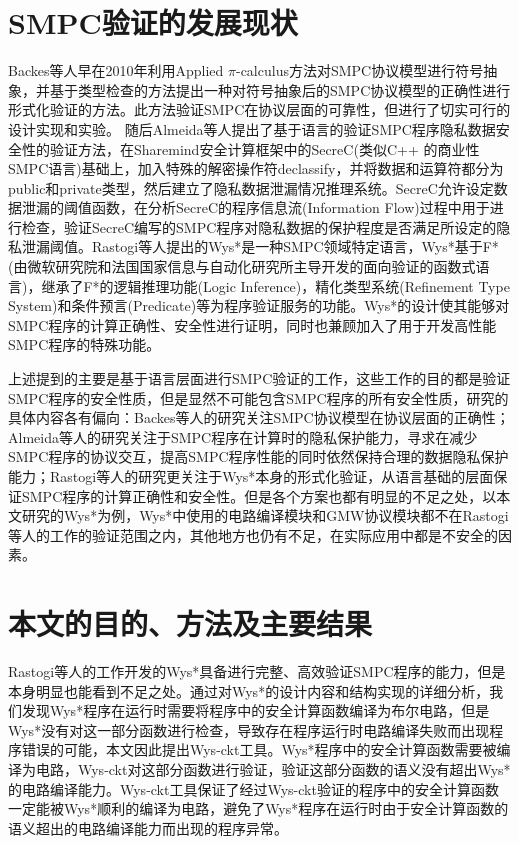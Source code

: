 \section{SMPC验证的发展现状}\label{sec:system}
Backes等人\citep{backes2010computationally}早在2010年利用Applied $\pi$-calculus方法对SMPC协议模型进行符号抽象，并基于类型检查的方法提出一种对符号抽象后的SMPC协议模型的正确性进行形式化验证的方法。此方法验证SMPC在协议层面的可靠性，但进行了切实可行的设计实现和实验。 随后Almeida等人\citep{almeida2018enforcing}提出了基于语言的验证SMPC程序隐私数据安全性的验证方法，在Sharemind\citep{bogdanov2008sharemind}安全计算框架中的SecreC(类似C++ 的商业性SMPC语言)基础上，加入特殊的解密操作符declassify，并将数据和运算符都分为public和private类型，然后建立了隐私数据泄漏情况推理系统。SecreC允许设定数据泄漏的阈值函数，在分析SecreC的程序信息流(Information Flow)过程中用于进行检查，验证SecreC编写的SMPC程序对隐私数据的保护程度是否满足所设定的隐私泄漏阈值。Rastogi等人\citep{rastogi2019textsc}提出的Wys*是一种SMPC领域特定语言，Wys*基于F*(由微软研究院和法国国家信息与自动化研究所主导开发的面向验证的函数式语言)，继承了F*的逻辑推理功能(Logic Inference)，精化类型系统(Refinement Type System)和条件预言(Predicate)等为程序验证服务的功能。Wys*的设计使其能够对SMPC程序的计算正确性、安全性进行证明，同时也兼顾加入了用于开发高性能SMPC程序的特殊功能。

上述提到的主要是基于语言层面进行SMPC验证的工作，这些工作的目的都是验证SMPC程序的安全性质，但是显然不可能包含SMPC程序的所有安全性质，研究的具体内容各有偏向：Backes等人的研究关注SMPC协议模型在协议层面的正确性；Almeida等人的研究关注于SMPC程序在计算时的隐私保护能力，寻求在减少SMPC程序的协议交互，提高SMPC程序性能的同时依然保持合理的数据隐私保护能力；Rastogi等人的研究更关注于Wys*本身的形式化验证，从语言基础的层面保证SMPC程序的计算正确性和安全性。但是各个方案也都有明显的不足之处，以本文研究的Wys*为例，Wys*中使用的电路编译模块和GMW协议模块都不在Rastogi等人的工作的验证范围之内，其他地方也仍有不足，在实际应用中都是不安全的因素。

\section{本文的目的、方法及主要结果}
Rastogi等人的工作开发的Wys*具备进行完整、高效验证SMPC程序的能力，但是本身明显也能看到不足之处。通过对Wys*的设计内容和结构实现的详细分析，我们发现Wys*程序在运行时需要将程序中的安全计算函数编译为布尔电路，但是Wys*没有对这一部分函数进行检查，导致存在程序运行时电路编译失败而出现程序错误的可能，本文因此提出Wys-ckt工具。Wys*程序中的安全计算函数需要被编译为电路，Wys-ckt对这部分函数进行验证，验证这部分函数的语义没有超出Wys*的电路编译能力。Wys-ckt工具保证了经过Wys-ckt验证的程序中的安全计算函数一定能被Wys*顺利的编译为电路，避免了Wys*程序在运行时由于安全计算函数的语义超出的电路编译能力而出现的程序异常。

